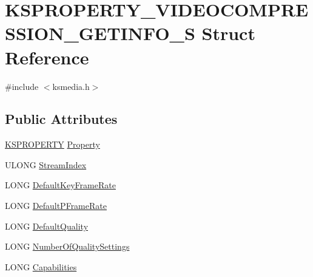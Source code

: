 \hypertarget{struct_k_s_p_r_o_p_e_r_t_y___v_i_d_e_o_c_o_m_p_r_e_s_s_i_o_n___g_e_t_i_n_f_o___s}{}\section{K\+S\+P\+R\+O\+P\+E\+R\+T\+Y\+\_\+\+V\+I\+D\+E\+O\+C\+O\+M\+P\+R\+E\+S\+S\+I\+O\+N\+\_\+\+G\+E\+T\+I\+N\+F\+O\+\_\+S Struct Reference}
\label{struct_k_s_p_r_o_p_e_r_t_y___v_i_d_e_o_c_o_m_p_r_e_s_s_i_o_n___g_e_t_i_n_f_o___s}


{\ttfamily \#include $<$ksmedia.\+h$>$}

\subsection*{Public Attributes}
\begin{DoxyCompactItemize}
\item 
\hyperlink{ks_8h_a4392f77c74e868d813d46c39ada4d660}{K\+S\+P\+R\+O\+P\+E\+R\+TY} \hyperlink{struct_k_s_p_r_o_p_e_r_t_y___v_i_d_e_o_c_o_m_p_r_e_s_s_i_o_n___g_e_t_i_n_f_o___s_ab5ea4d6525229682b26f86f09a8475bb}{Property}
\item 
U\+L\+O\+NG \hyperlink{struct_k_s_p_r_o_p_e_r_t_y___v_i_d_e_o_c_o_m_p_r_e_s_s_i_o_n___g_e_t_i_n_f_o___s_a0afa1e91ddeb085a4c8a7f6d411546e0}{Stream\+Index}
\item 
L\+O\+NG \hyperlink{struct_k_s_p_r_o_p_e_r_t_y___v_i_d_e_o_c_o_m_p_r_e_s_s_i_o_n___g_e_t_i_n_f_o___s_aaee259eef3949dc6bbe30bd8ad3072f8}{Default\+Key\+Frame\+Rate}
\item 
L\+O\+NG \hyperlink{struct_k_s_p_r_o_p_e_r_t_y___v_i_d_e_o_c_o_m_p_r_e_s_s_i_o_n___g_e_t_i_n_f_o___s_a1259500c00676f11f40d54a669d44872}{Default\+P\+Frame\+Rate}
\item 
L\+O\+NG \hyperlink{struct_k_s_p_r_o_p_e_r_t_y___v_i_d_e_o_c_o_m_p_r_e_s_s_i_o_n___g_e_t_i_n_f_o___s_a6136dec8d928cc1c981b0f79821e0a58}{Default\+Quality}
\item 
L\+O\+NG \hyperlink{struct_k_s_p_r_o_p_e_r_t_y___v_i_d_e_o_c_o_m_p_r_e_s_s_i_o_n___g_e_t_i_n_f_o___s_a1f250130e1618fb380b2208dd2a72951}{Number\+Of\+Quality\+Settings}
\item 
L\+O\+NG \hyperlink{struct_k_s_p_r_o_p_e_r_t_y___v_i_d_e_o_c_o_m_p_r_e_s_s_i_o_n___g_e_t_i_n_f_o___s_a7619f0d33bf7d9373555416e67674662}{Capabilities}
\end{DoxyCompactItemize}


